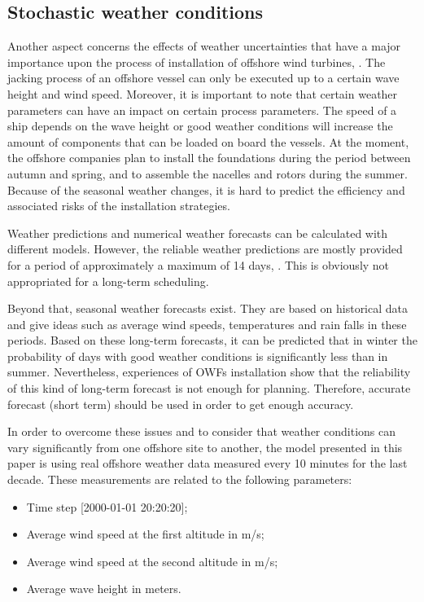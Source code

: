 \subsection{Stochastic weather conditions}
Another aspect concerns the effects of weather uncertainties that have a major importance upon the process of installation of offshore wind turbines, \cite{COMPIT11}. The jacking process of an offshore vessel can only be executed up to a certain wave height and wind speed. Moreover, it is important to note that certain weather parameters can have an impact on certain process parameters. The speed of a ship depends on the wave height or good weather conditions will increase the amount of components that can be loaded on board the vessels. At the moment, the offshore companies plan to install the foundations during the period between autumn and spring, and to assemble the nacelles and rotors during the summer. Because of the seasonal weather changes, it is hard to predict the efficiency and associated risks of the installation strategies.

Weather predictions and numerical weather forecasts can be calculated with different models. However, the reliable weather predictions are mostly provided for a period of approximately a maximum of 14 days, \cite{hinnenthal2007}. This is obviously not appropriated for a long-term scheduling.

Beyond that, seasonal weather forecasts exist. They are based on historical data and give ideas such as average wind speeds, temperatures and rain falls in these periods. Based on these long-term forecasts, it can be predicted that in winter the probability of days with good weather conditions is significantly less than in summer. Nevertheless, experiences of OWFs installation show that the reliability of this kind of long-term forecast is not enough for planning. Therefore, accurate forecast (short term) should be used in order to get enough accuracy.

In order to overcome these issues and to consider that weather conditions can vary significantly from one offshore site to another, the model presented in this paper is using real offshore weather data measured every 10 minutes for the last decade.  
These measurements are related to the following parameters:
\begin{itemize}
\item Time step [2000-01-01 20:20:20];
\item Average wind speed at the first altitude in m/s;
\item Average wind speed at the second altitude in m/s;
\item Average wave height in meters.
\end{itemize}

